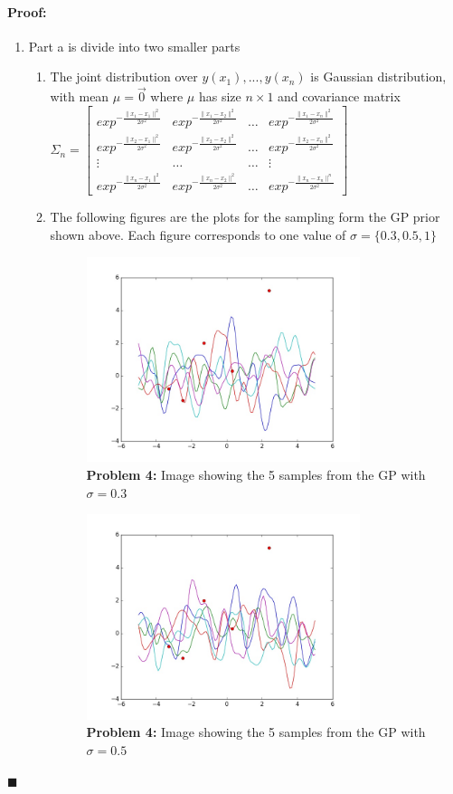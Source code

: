 \documentclass[12pt]{article}
\newenvironment{proof}{\paragraph{Proof: }}{\hfill$\blacksquare$}
\begin{document}
\begin{proof}
\begin{enumerate}
\item Part a is divide into two smaller parts
	\begin{enumerate}
		\item The joint distribution over $y(x_1),...,y(x_n)$ is Gaussian distribution, with mean $\mu = \vec{0}$ where $\mu$ has size $n \times 1$ and covariance matrix $\Sigma_{n} = \left[ \begin{matrix} exp^{-\frac{\|x_1 - x_1\|^2}{2 \sigma^2}} & exp^{-\frac{\|x_1 - x_2\|^2}{2 \sigma^2}} & \dots & exp^{-\frac{\|x_1 - x_n\|^2}{2 \sigma^2}} \\ exp^{-\frac{\|x_2 - x_1\|^2}{2 \sigma^2}} & exp^{-\frac{\|x_2 - x_2\|^2}{2 \sigma^2}} & \dots & exp^{-\frac{\|x_2 - x_n\|^2}{2 \sigma^2}} \\ \vdots & \dots & \dots & \vdots \\ exp^{-\frac{\|x_n - x_1\|^2}{2 \sigma^2}} & exp^{-\frac{\|x_n - x_2\|^2}{2 \sigma^2}} & \dots & exp^{-\frac{\|x_n - x_n\|^n}{2 \sigma^2}} \end{matrix}\right]$
		\item The following figures are the plots for the  sampling form the GP prior shown above. Each figure corresponds to one value of $\sigma = \{0.3,0.5,1\}$

		\begin{figure}[!htbp]
\centering
\includegraphics[width=8cm]{hw_p4_prior_03.jpg}
\caption{\textbf{Problem 4:} Image showing the  5 samples from the GP with $\sigma = 0.3$}
\end{figure}

		\begin{figure}[!htbp]
\centering
\includegraphics[width=8cm]{hw_p4_prior_05.jpg}
\caption{\textbf{Problem 4:} Image showing the  5 samples from the GP with $\sigma = 0.5$}
\end{figure}


\end{enumerate}
\end{enumerate}
\end{proof}
\end{document}
